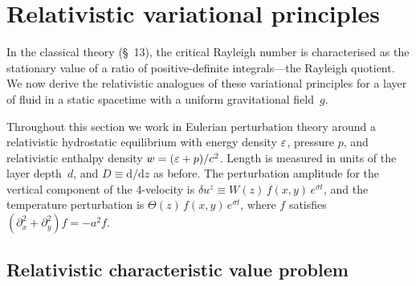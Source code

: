 %
%

\section{Relativistic variational principles}\label{sec:rel-13}

In the classical theory (\S~13), the critical Rayleigh number is
characterised as the stationary value of a ratio of positive-definite
integrals---the Rayleigh quotient.  We now derive the relativistic
analogues of these variational principles for a layer of fluid in a
static spacetime with a uniform gravitational field~$g$.

Throughout this section we work in Eulerian perturbation theory around
a relativistic hydrostatic equilibrium with energy density
$\varepsilon$, pressure $p$, and relativistic enthalpy density
$w = (\varepsilon + p)/c^{2}$.  Length is measured in units of the layer
depth~$d$, and $D \equiv \mathrm{d}/\mathrm{d}z$ as before.  The
perturbation amplitude for the vertical component of the 4-velocity is
$\delta u^z \equiv W(z)\,f(x,y)\,e^{\sigma t}$, and the temperature
perturbation is $\Theta(z)\,f(x,y)\,e^{\sigma t}$, where $f$ satisfies
$(\partial_x^2+\partial_y^2)f = -a^2 f$.

\subsection{Relativistic characteristic value problem}\label{sec:rel-13-prelim}


